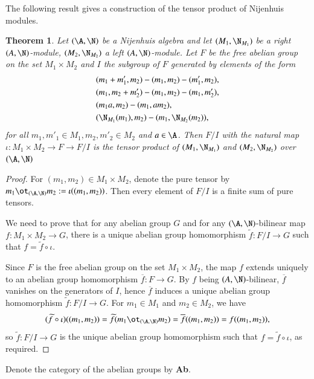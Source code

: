 \documentclass[12pt]{amsart}
\newtheorem{theorem}{Theorem}[section]
\theoremstyle{definition}
\renewcommand\tilde[1]{\widetilde{#1}}
\begin{document}
The following result gives a construction of the tensor product of Nijenhuis modules.

\begin{theorem}
Let $(\A,\N)$ be a Nijenhuis algebra and let $(M_1,\N_{M_1})$ be a right $(A,\N)$-module, $(M_2,\N_{M_2})$ a left $(A, \N)$-module.
Let $F$ be the free abelian group on the set $M_1 \times M_2$ and $I$ the subgroup of $F$ generated by  elements of the form
\begin{align*}
& (m_1+m'_1, m_2) - (m_1, m_2)-(m'_1, m_2),\\
& (m_1, m_2+m'_2)- (m_1, m_2) - (m_1, m'_2),\\
& (m_1a, m_2)- (m_1, am_2), \\ 
& (\N_{M_1}(m_1), m_2)-(m_1, \N_{M_2}(m_2)),
\end{align*}
for all $m_1, m'_1\in M_1, m_2, m'_2\in M_2$ and $a\in \A$.
Then $F/I$ with the natural map $\iota: M_1 \times M_2 \rightarrow F \rightarrow F/I$ is the tensor product of $(M_1,\N_{M_1})$ and $(M_2,\N_{M_2})$ over $(\A,\N)$
%
\end{theorem}

\begin{proof}
For $(m_1,m_2)\in M_1\times M_2$, denote the pure tensor by $m_1 \ot_{(\A,\N)} m_2:= \iota((m_1,m_2))$. Then every element of $F/I$ is a finite sum of pure tensors. 

We need to prove that for any abelian group $G$ and for any $(\A,\N)$-bilinear map $f: M_1\times M_2 \rightarrow G$, there is a unique abelian group homomorphism $\tilde{f}: F/I \to G$ such that $f=\tilde{f} \circ \iota$.

Since $F$ is the free abelian group on the set $M_1 \times M_2$, the map $f$ extends uniquely to an abelian group homomorphism $\overline{f}: F \to G$. By $f$ being $(A,\N)$-bilinear, $\overline{f}$ vanishes on the generators of $I$, hence $\overline{f}$ induces a unique abelian group homomorphism $\tilde{f}: F/I \to G$. For $m_1 \in M_1$ and $m_2 \in M_2$, we have 
\[
(\tilde{f} \circ \iota)((m_1,m_2))=\tilde{f} (m_1 \ot_{(\A,\N)} m_2)=\overline{f}((m_1,m_2))=f((m_1,m_2)),
\]
so $\tilde{f}: F/I \to G$ is the unique abelian group homomorphism such that $f=\tilde{f} \circ \iota$, as required. 
\end{proof}

Denote the category of the abelian groups by {\bf Ab}.
\end{document}
